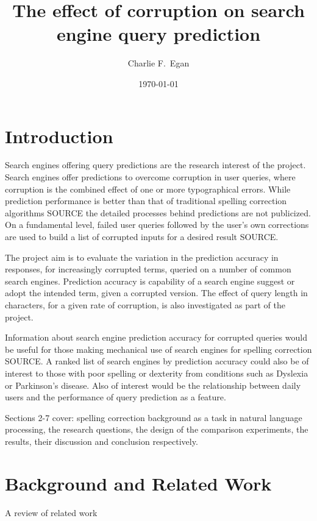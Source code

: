 \documentclass{csfourzero}
\title{The effect of corruption on search engine query prediction}
\author{Charlie F.\ Egan}
\date{\today}
\begin{document}
\maketitle

\section{Introduction}
\label{sec:intro}

Search engines offering query predictions are the research interest of the project. Search engines offer predictions to overcome corruption in user queries, where corruption is the combined effect of one or more typographical errors. While prediction performance is better than that of traditional spelling correction algorithms SOURCE the detailed processes behind predictions are not publicized. On a fundamental level, failed user queries followed by the user's own corrections are used to build a list of corrupted inputs for a desired result SOURCE.

The project aim is to evaluate the variation in the prediction accuracy in responses, for increasingly corrupted terms, queried on a number of common search engines. Prediction accuracy is capability of a search engine suggest or adopt the intended term, given a corrupted version. The effect of query length in characters, for a given rate of corruption, is also investigated as part of the project.

Information about search engine prediction accuracy for corrupted queries would be useful for those making mechanical use of search engines for spelling correction SOURCE. A ranked list of search engines by prediction accuracy could also be of interest to those with poor spelling or dexterity from conditions such as Dyslexia or Parkinson's disease. Also of interest would be the relationship between daily users and the performance of query prediction as a feature.

Sections 2-7 cover: spelling correction background as a task in natural language processing, the research questions, the design of the comparison experiments, the results, their discussion and conclusion respectively.

\section{Background and Related Work}
\label{sec:lit}

A review of related work \cite{p2pbookv2,Burnett,p2pwiki}
\end{document}
